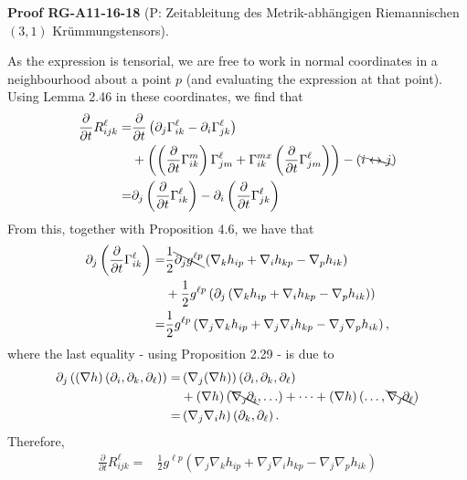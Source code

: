\documentclass[10pt, letterpaper]{article}
\newcommand{\CustomHeading}[3]{%
  \par\medskip\noindent%
  \textbf{#1 #2} \textnormal{(#3)}.\enskip%
}
\newenvironment{PROOF}[2]{\begin{unitbox}\CustomHeading{Proof}{#1}{#2}}{\end{unitbox}}
\begin{document}
\begin{PROOF}{RG-A11-16-18}{P: Zeitableitung des Metrik-abhängigen Riemannischen $(3,1)$ Krümmungstensors}
As the expression is tensorial, we are free to work in normal coordinates in a neighbourhood about a point $p$ (and evaluating the expression at that point). Using Lemma 2.46 in these coordinates, we find that
$$
\begin{aligned}
\frac{\partial}{\partial t} R_{i j k}^{\ell}= & \frac{\partial}{\partial t}\left(\partial_{j} \Gamma_{i k}^{\ell}-\partial_{i} \Gamma_{j k}^{\ell}\right) \\
& +\left(\left(\frac{\partial}{\partial t} \Gamma_{i k}^{m}\right) \Gamma_{j m}^{\ell}+\Gamma_{i k}^{m x}\left(\frac{\partial}{\partial t} \Gamma_{j m}^{\ell}\right)\right)-(\bcancel{i \leftrightarrow j}) \\
= & \partial_{j}\left(\frac{\partial}{\partial t} \Gamma_{i k}^{\ell}\right)-\partial_{i}\left(\frac{\partial}{\partial t} \Gamma_{j k}^{\ell}\right)
\end{aligned}
$$
From this, together with Proposition 4.6, we have that
$$
\begin{aligned}
\partial_{j}\left(\frac{\partial}{\partial t} \Gamma_{i k}^{\ell}\right)= & \frac{1}{2} \bcancel{\partial_{j} g^{\ell p}}\left(\nabla_{k} h_{i p}+\nabla_{i} h_{k p}-\nabla_{p} h_{i k}\right) \\
& +\frac{1}{2} g^{\ell p}\left(\partial_{j}\left(\nabla_{k} h_{i p}+\nabla_{i} h_{k p}-\nabla_{p} h_{i k}\right)\right) \\
= & \frac{1}{2} g^{\ell p}\left(\nabla_{j} \nabla_{k} h_{i p}+\nabla_{j} \nabla_{i} h_{k p}-\nabla_{j} \nabla_{p} h_{i k}\right),
\end{aligned}
$$
where the last equality - using Proposition 2.29 - is due to
$$
\begin{aligned}
\partial_{j}\left((\nabla h)\left(\partial_{i}, \partial_{k}, \partial_{\ell}\right)\right)
= & \left(\nabla_{j}(\nabla h)\right)\left(\partial_{i}, \partial_{k}, \partial_{\ell}\right) \\
& +(\nabla h)\left(\bcancel{\nabla_{\jmath} \partial_{i}}, \ldots\right)+\cdots+(\nabla h)\left(\ldots, \bcancel{\nabla_{\jmath} \partial_{\ell}}\right) \\
= & \left(\nabla_{j} \nabla_{i} h\right)\left(\partial_{k}, \partial_{\ell}\right) .
\end{aligned}
$$
Therefore,
$$
\begin{aligned}
\frac{\partial}{\partial t} R_{i j k}^{\ell}= & \frac{1}{2} g^{\ell p}\left(\nabla_{j} \nabla_{k} h_{i p}+\nabla_{j} \nabla_{i} h_{k p}-\nabla_{j} \nabla_{p} h_{i k}\right) \\

\end{aligned}$$
\end{PROOF}
\end{document}
